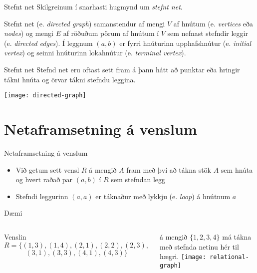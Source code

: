 \documentclass{beamer}
\begin{document}
\begin{frame}{Stefnt net}
Skilgreinum í snarhasti hugmynd um \emph{stefnt net}.
\begin{tcolorbox}[title=Stefnt net]
Stefnt net (e. \emph{directed graph}) samanstendur af mengi $V$ af hnútum (e. \emph{vertices} eða \emph{nodes}) og mengi $E$ af röðuðum pörum af hnútum í $V$ sem nefnast stefndir leggir (e. \emph{directed edges}). Í leggnum $(a, b)$ er fyrri hnúturinn upphafshnútur (e. \emph{initial vertex}) og seinni hnúturinn lokahnútur (e. \emph{terminal vertex}).
\end{tcolorbox}
\end{frame}

\begin{frame}{Stefnt net}
Stefnd net eru oftast sett fram á þann hátt að punktar eða hringir tákni hnúta og örvar tákni stefndu leggina.

\begin{center}
\texttt{[image: directed-graph]}
\end{center}

\end{frame}

\section{Netaframsetning á venslum}

\begin{frame}{Netaframsetning á venslum}
\begin{itemize}
 \item Við getum sett vensl $R$ á mengið $A$ fram með því að tákna stök $A$ sem hnúta og hvert raðað par $(a, b)$ í $R$ sem stefndan legg
 \item Stefndi leggurinn $(a, a)$ er táknaður með lykkju (e. \emph{loop}) á hnútnum $a$
\end{itemize}
\end{frame}

\begin{frame}{Dæmi}
\begin{columns}
Venslin
\[
 R = \{(1, 3), (1, 4), (2, 1), (2, 2), (2, 3),
\]
\[
 (3, 1), (3, 3), (4, 1), (4, 3)\}
\]

á mengið $\{1, 2, 3, 4\}$ má tákna með stefnda netinu hér til hægri.
\texttt{[image: relational-graph]}
\end{columns}
\end{frame}
\end{document}
